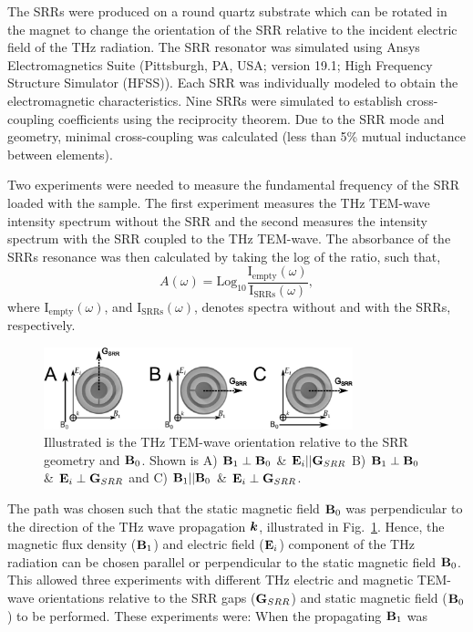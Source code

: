 The SRRs were produced on a round quartz substrate which can be rotated in the magnet to change the orientation of the SRR relative to the incident electric field of the THz radiation. The SRR resonator was simulated using Ansys Electromagnetics Suite (Pittsburgh, PA, USA; version 19.1; High Frequency Structure Simulator (HFSS)). Each SRR was individually modeled to obtain the electromagnetic characteristics. Nine SRRs were simulated to establish cross-coupling coefficients using the reciprocity theorem. Due to the SRR mode and geometry, minimal cross-coupling was calculated (less than 5\% mutual inductance between elements). 

Two experiments were needed to measure the fundamental frequency of the SRR loaded with the sample. The first experiment measures the THz TEM-wave intensity spectrum without the SRR and the second measures the intensity spectrum with the SRR coupled to the THz TEM-wave. The absorbance of the SRRs resonance was then calculated by taking the log of the ratio, such that,
\begin{equation}
  A(\omega) = \text{Log}_{10}\frac{\text{I}_{\text{empty}}(\omega)}{\text{I}_{\text{SRRs}}(\omega)},  
\end{equation}
where $\text{I}_{\text{empty}}(\omega)$, and $\text{I}_{\text{SRRs}}(\omega)$, denotes spectra without and with the SRRs, respectively. 


\begin{figure}[htp]
\centering
  \includegraphics[width=0.8\textwidth]{Kapitel/Ch4-Images/Ch4-BeamPath.eps}
  \caption[THz TEM-wave Orientation Relative to SRR]{Illustrated is the THz TEM-wave orientation relative to the SRR geometry and $\textbf{B}_{0}$. Shown is A) $\textbf{B}_{1} \perp \textbf{B}_{0}$ \& $\textbf{E}_{i}||\textbf{G}_{SRR}$ B) $\textbf{B}_{1} \perp \textbf{B}_{0}$ \& $\textbf{E}_{i}\perp\textbf{G}_{SRR}$ and C) $\textbf{B}_{1} || \textbf{B}_{0}$ \& $\textbf{E}_{i}\perp\textbf{G}_{SRR}$.}
  \label{ch4-fig:BeamGEO}
\end{figure}

The path was chosen such that the static magnetic field $\textbf{B}_{0}$ was perpendicular to the direction of the THz wave propagation $\boldsymbol{k}$, illustrated in Fig.~\ref{ch4-fig:BeamGEO}. Hence, the magnetic flux density ($\textbf{B}_{1}$) and electric field ($\textbf{E}_{i}$) component of the THz radiation can be chosen parallel or perpendicular to the static magnetic field $\textbf{B}_{0}$. This allowed three experiments with different THz electric and magnetic TEM-wave orientations relative to the SRR gaps ($\textbf{G}_{SRR}$) and static magnetic field ($\textbf{B}_{0}$) to be performed. These experiments were: When the propagating $\textbf{B}_{1}$ was 

